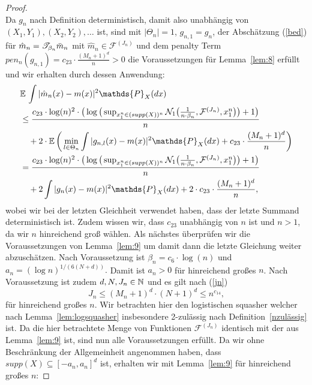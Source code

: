 \begin{proof}
\begin{equation}
\end{equation}
Da $g_n$ nach Definition deterministisch, damit also unabhängig von $(X_1, Y_1), (X_2, Y_2),\dots$ ist, sind mit $|\Theta_n| = 1$, $g_{n,1} = g_n$, der Abschätzung (\ref{bed}) für $\hat{m}_n = \mathscr{T}_{\beta_n}\bar{m}_n$ mit $\hat{m}_n \in \mathcal{F}^{(J_n)}$ und dem penalty Term $pen_n(g_{n,1}) = c_{23} \cdot \frac{(M_n + 1)^d}{n} > 0$ die Voraussetzungen für Lemma~\ref{lem:8} erfüllt und wir erhalten durch dessen Anwendung:
\begin{equation*}
\begin{split}
& \E \int |\hat{m}_n(x) - m(x)|^2 \mathds{P}_X(dx) \\
& \leq \frac{c_{23} \cdot \log(n)^2 \cdot \big(\log\big(\sup_{x_1^n \in (supp(X))^n}\mathcal{N}_1\big(\frac{1}{n \cdot \beta_n},\mathcal{F}^{(J_n)},x_1^n\big)\big) + 1\big)}{n} \\
& \quad + 2 \cdot \E\bigg(\min_{l \in \Theta_n} \int |g_{n,l}(x) - m(x)|^2 \mathds{P}_X(dx) + c_{23} \cdot \frac{(M_n + 1)^d}{n}\bigg) \\
& = \frac{c_{23} \cdot \log(n)^2 \cdot \big(\log\big(\sup_{x_1^n \in (supp(X))^n}\mathcal{N}_1\big(\frac{1}{n \cdot \beta_n},\mathcal{F}^{(J_n)},x_1^n\big)\big) + 1\big)}{n} \\
& \quad + 2 \int |g_{n}(x) - m(x)|^2 \mathds{P}_X(dx) + 2 \cdot c_{23} \cdot \frac{(M_n + 1)^d}{n},
\end{split}
\end{equation*}
wobei wir bei der letzten Gleichheit verwendet haben, dass der letzte Summand deterministisch ist. Zudem wissen wir, dass $c_{23}$ unabhängig von $n$ ist und $n > 1$, da wir $n$ hinreichend groß wählen.
Als nächstes überprüfen wir die Voraussetzungen von Lemma~\ref{lem:9} um damit dann die letzte Gleichung weiter abzuschätzen.
Nach Voraussetzung ist $\beta_n = c_6 \cdot \log(n)$ und $a_n = (\log n)^{1/(6(N + d))}.$ Damit ist $a_n > 0$ für hinreichend großes $n$. Nach Voraussetzung ist zudem $d, N, J_n \in \mathbb{N}$ und es gilt nach (\ref{jn}) 
$$J_n \leq (M_n + 1)^d \cdot (N + 1)^d \leq n^{c_{14}},$$
für hinreichend großes $n$. Wir betrachten hier den logistischen squasher welcher nach Lemma~\ref{lem:logsquasher} insbesondere 2-zulässig nach Definition~\ref{nzulässig} ist. Da die hier betrachtete Menge von Funktionen $\mathcal{F}^{(J_n)}$ identisch mit der aus Lemma~\ref{lem:9} ist, sind nun alle Voraussetzungen erfüllt. Da wir ohne Beschränkung der Allgemeinheit angenommen haben, dass $supp(X) \subseteq [-a_n, a_n]^d$ ist, erhalten wir mit Lemma~\ref{lem:9} für hinreichend großes $n$:

\end{proof}
